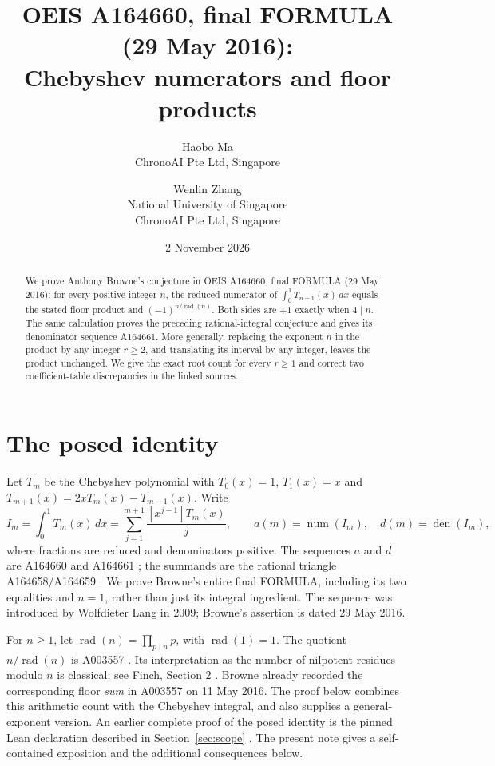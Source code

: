 \documentclass[11pt]{article}
\title{OEIS A164660, final FORMULA (29 May 2016):\\
Chebyshev numerators and floor products}
\author{Haobo Ma\\\small ChronoAI Pte Ltd, Singapore
\and Wenlin Zhang\\\small National University of Singapore\\
\small ChronoAI Pte Ltd, Singapore}
\date{2 November 2026}
\newcommand{\rad}{\operatorname{rad}}
\newcommand{\num}{\operatorname{num}}
\newcommand{\den}{\operatorname{den}}
\begin{document}
\maketitle
\begin{abstract}
We prove Anthony Browne's conjecture in OEIS A164660, final FORMULA
(29 May 2016): for every positive integer $n$, the reduced numerator of
$\int_0^1T_{n+1}(x)\,dx$ equals the stated floor product and
$(-1)^{n/\rad(n)}$.
Both sides are $+1$ exactly when $4\mid n$.
The same calculation proves the preceding rational-integral conjecture
and gives its denominator sequence A164661.
More generally, replacing the exponent $n$ in the product by any integer
$r\ge2$, and translating its interval by any integer, leaves the product
unchanged. We give the exact root count for every $r\ge1$ and correct two
coefficient-table discrepancies in the linked sources.
\end{abstract}

\section{The posed identity}
Let $T_m$ be the Chebyshev polynomial with $T_0(x)=1$, $T_1(x)=x$ and
$T_{m+1}(x)=2xT_m(x)-T_{m-1}(x)$.
Write
\begin{equation}\label{eq:def}
 I_m=\int_0^1T_m(x)\,dx
 =\sum_{j=1}^{m+1}\frac{[x^{j-1}]T_m(x)}{j},\qquad
 a(m)=\num(I_m),\quad d(m)=\den(I_m),
\end{equation}
where fractions are reduced and denominators positive.
The sequences $a$ and $d$ are A164660 and A164661
\cite{oeis660,oeis661}; the summands are the rational triangle
A164658/A164659 \cite{oeis658,oeis659}.
We prove Browne's entire final FORMULA, including its two equalities and
$n=1$, rather than just its integral ingredient.
The sequence was introduced by Wolfdieter Lang in 2009; Browne's assertion
is dated 29 May 2016.

For $n\ge1$, let $\rad(n)=\prod_{p\mid n}p$, with $\rad(1)=1$.
The quotient $n/\rad(n)$ is A003557 \cite{oeis3557,oeis7947}.
Its interpretation as the number of nilpotent residues modulo $n$ is
classical; see Finch, Section 2 \cite{finch}.
Browne already recorded the corresponding floor \emph{sum} in A003557
on 11 May 2016. The proof below combines this arithmetic count with the
Chebyshev integral, and also supplies a general-exponent version.
An earlier complete proof of the posed identity is the pinned Lean
declaration described in Section~\ref{sec:scope} \cite{lean}.
The present note gives a self-contained exposition and the additional
consequences below.
\end{document}
